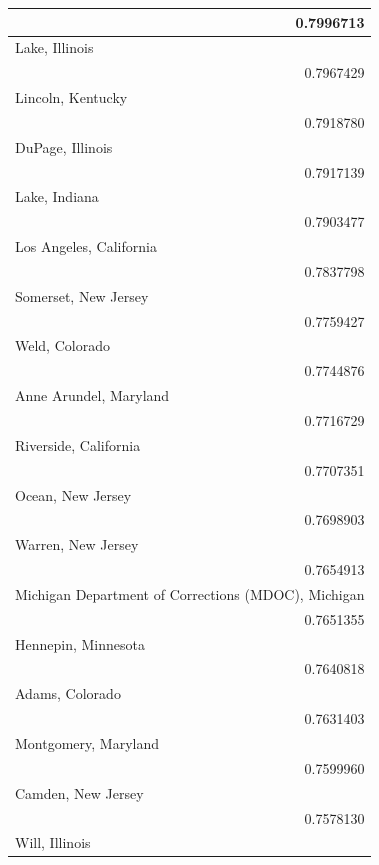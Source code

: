\documentclass[
]{article}
\begin{document}
\begin{longtable}{r}
\midrule
0.7996713 \\ 
\midrule
\multicolumn{1}{l}{Lake, Illinois} \\ 
\midrule
0.7967429 \\ 
\midrule
\multicolumn{1}{l}{Lincoln, Kentucky} \\ 
\midrule
0.7918780 \\ 
\midrule
\multicolumn{1}{l}{DuPage, Illinois} \\ 
\midrule
0.7917139 \\ 
\midrule
\multicolumn{1}{l}{Lake, Indiana} \\ 
\midrule
0.7903477 \\ 
\midrule
\multicolumn{1}{l}{Los Angeles, California} \\ 
\midrule
0.7837798 \\ 
\midrule
\multicolumn{1}{l}{Somerset, New Jersey} \\ 
\midrule
0.7759427 \\ 
\midrule
\multicolumn{1}{l}{Weld, Colorado} \\ 
\midrule
0.7744876 \\ 
\midrule
\multicolumn{1}{l}{Anne Arundel, Maryland} \\ 
\midrule
0.7716729 \\ 
\midrule
\multicolumn{1}{l}{Riverside, California} \\ 
\midrule
0.7707351 \\ 
\midrule
\multicolumn{1}{l}{Ocean, New Jersey} \\ 
\midrule
0.7698903 \\ 
\midrule
\multicolumn{1}{l}{Warren, New Jersey} \\ 
\midrule
0.7654913 \\ 
\midrule
\multicolumn{1}{l}{Michigan Department of Corrections (MDOC), Michigan} \\ 
\midrule
0.7651355 \\ 
\midrule
\multicolumn{1}{l}{Hennepin, Minnesota} \\ 
\midrule
0.7640818 \\ 
\midrule
\multicolumn{1}{l}{Adams, Colorado} \\ 
\midrule
0.7631403 \\ 
\midrule
\multicolumn{1}{l}{Montgomery, Maryland} \\ 
\midrule
0.7599960 \\ 
\midrule
\multicolumn{1}{l}{Camden, New Jersey} \\ 
\midrule
0.7578130 \\ 
\midrule
\multicolumn{1}{l}{Will, Illinois} \\ 

\end{longtable}
\end{document}
